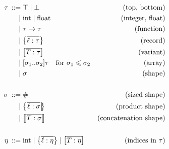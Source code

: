 \begin{align*}
\graintro \tau
\top \mid \bot 
& \text{(top, bottom)} 
\graitem
\mathrm{int} \mid \mathrm{float} 
& \text{(integer, float)}
\graitem
\tau \sfntype \tau 
& \text{(function)} 
\graitem
\srecordtype{\overline{\ell : \tau}} 
& \text{(record)} 
\graitem
\svarianttype{\overline{T : \tau}} 
& \text{(variant)}
\graitem
\sarraytype{\sigma_1}{\sigma_2}{\tau} \quad \text{for } \sigma_1 \sub \sigma_2 
& \text{(array)}
\graitem
\sigma 
& \text{(shape)} \\ 
\\
\graintro \sigma
\ssized 
& \text{(sized shape)}
\graitem
\sproducttype{\overline{ \ell : \sigma }} 
& \text{(product shape)} 
\graitem
\sconcattype{\overline{ T : \sigma }} 
& \text{(concatenation shape)} \\
\\
\graintro \eta
\mathrm{int} 
\mid
\srecordtype{\overline{\ell : \eta}} 
\mid
\svarianttype{\overline{T : \eta}} & \text{(indices in } \tau)
\end{align*}
